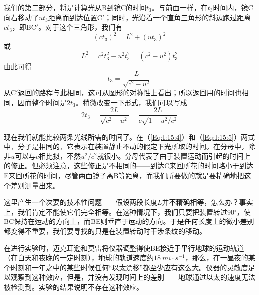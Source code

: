 我们的第二部分，将是计算光从B到镜C的时间$t_3$。与前面一样，在$t_3$时间内，镜C向右移动了$ut_3$距离而到达位置C$'$；同时，光沿着一个直角三角形的斜边跑过距离$ct_3$，即BC$'$。对于这个三角形，我们有
\begin{equation*}
    (ct_3)^2=L^2+(ut_3)^2
\end{equation*}
或
\begin{equation*}
    L^2=c^2t^2_3-u^2t^2_3=(c^2-u^2)t^2_3
\end{equation*}
由此可得
\begin{equation*}
    t_3=\frac{L}{\sqrt{c^2-u^2}}
\end{equation*}
从C$'$返回的路程与此相同，这可从图形的对称性上看出；所以返回用的时间也相同，因而整个时间是$2t_3$。稍微改变一下形式，我们可以写成
\begin{equation}
    \label{Eq:I:15:5}
    2t_3=\frac{2L}{\sqrt{c^2-u^2}}=\frac{2L}{c\sqrt{1-u^2/c^2}}
\end{equation}

现在我们就能比较两条光线所需的时间了。在（\ref{Eq:I:15:4}）和（\ref{Eq:I:15:5}）两式中，分子是相同的，它表示在装置静止不动的假定下光所取的时间。在分母中，除非$u$可以与$c$相比拟，不然$u^2/c^2$就很小。分母代表了由于装置运动而引起的时间上的修正。但必须注意，这些修正是不相同的——到达C来回所花的时间略小于到达E来回所花的时间，尽管两面镜子离B等距离，而我们所要做的就是要精确地把这个差别测量出来。

这里产生一个次要的技术性问题——假设两段长度$L$并不精确相等，怎么办？事实上，我们肯定不能使它们完全相等。在这种情况下，我们只要把装置转过90$^\circ$，使BC保持在运动的方向上，而BE则垂直于运动的方向。于是任何长度上的微小差别都变得不重要，我们要寻找的只是在装置转动时干涉条纹的移动。

在进行实验时，迈克耳逊和莫雷将仪器调整得使BE接近于平行地球的运动轨道（在白天和夜晚的一定时刻），地球的轨道速度约$18~mi \cdot s^{-1}$，那么，在一昼夜的某个时刻和一年之中的某些时候任何“以太漂移”都至少应有这么大。仪器的灵敏度足以观察到这种效应，但是，并没有发现时间上的差别——地球通过以太的速度无法被检测到。实验的结果说明不存在这种效应。

